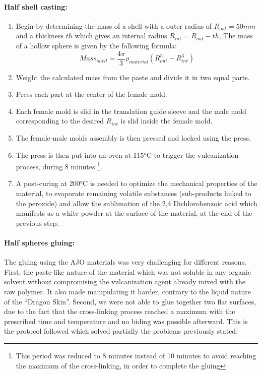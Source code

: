 \paragraph{Half shell casting:}
\begin{enumerate}
	\item Begin by determining the mass of a shell with a outer radius of $R_{out}= 50 mm$ and a thickness $th$ which gives an internal radius $R_{int} = R_{out}-th$, The mass of a hollow sphere is given by the following formula:
		\[Mass_{shell} = \frac{4\pi}{3}\rho_{material} (R_{out}^3-R_{int}^3) \]

	\item Weight the calculated mass from the paste and divide it in two equal parts.
	\item Press each part at the center of the female mold.
	\item Each female mold is slid in the translation guide sleeve and the male mold corresponding to the desired $R_{int}$ is slid inside the female mold.
	\item The female-male molds assembly is then pressed and locked using the press.
	\item The press is then put into an oven at 115°C to trigger the vulcanization process, during 8 minutes \footnote{This period was reduced to 8 minutes instead of 10 minutes to avoid reaching the maximum of the cross-linking, in order to complete the gluing}.
	\item A post-curing at 200°C is needed to optimize the mechanical properties of the material, to evaporate remaining volatile substances (sub-products linked to the peroxide) and allow the sublimation of the 2,4 Dichlorobenzoic acid which manifests as a white powder at the surface of the material, at the end of the previous step.
\end{enumerate}

\paragraph{Half spheres gluing:}
The gluing using the AJO materials was very challenging for different reasons. First, the paste-like nature of the material which was not soluble in any organic solvent without compromising the vulcanization agent already mixed with the raw polymer. It also made manipulating it harder, contrary to the liquid nature of the "`Dragon Skin"'. Second, we were not able to glue together two flat surfaces, due to the fact that the cross-linking process reached a maximum with the prescribed time and temperature and no biding was possible afterward.
This is the protocol followed which solved partially the problems previously stated:

